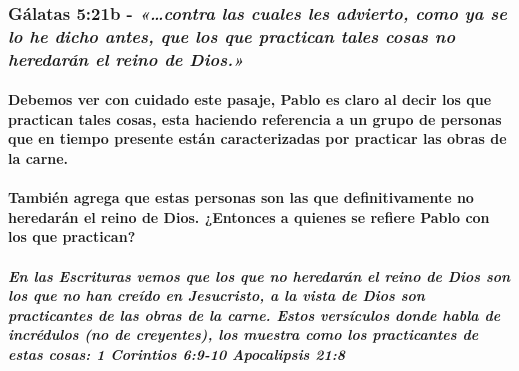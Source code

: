 \documentclass[11a pt,twoside]{article}
\newcommand{\scripture}[1]{%
  {\fontsize{12pt}{16pt}\selectfont\ScriptureFont\itshape #1}%
}
\def\textbf#1{#1}%
\let\oldsubsubsection\subsubsection
\renewcommand{\subsubsection}{\needspace{4\baselineskip}\oldsubsubsection}
\let\oldparagraph\paragraph
\renewcommand{\paragraph}{\needspace{3\baselineskip}\oldparagraph}
\let\oldsubparagraph\subparagraph
\renewcommand{\subparagraph}{\needspace{2\baselineskip}\oldsubparagraph}
\begin{document}
\subsubsection{\texorpdfstring{Gálatas 5:21b -
\scripture{«…contra las cuales les advierto, como ya se lo he dicho antes, que los que practican tales cosas no heredarán el reino de Dios.»}}{Gálatas 5:21b - }}\label{guxe1latas-521b---contra-las-cuales-les-advierto-como-ya-se-lo-he-dicho-antes-que-los-que-practican-tales-cosas-no-heredaruxe1n-el-reino-de-dios.}

\paragraph{Debemos ver con cuidado este pasaje, Pablo es claro al decir
los que practican tales cosas, esta haciendo referencia a un grupo de
personas que en tiempo presente están caracterizadas por practicar las
obras de la
carne.}\label{debemos-ver-con-cuidado-este-pasaje-pablo-es-claro-al-decir-los-que-practican-tales-cosas-esta-haciendo-referencia-a-un-grupo-de-personas-que-en-tiempo-presente-estuxe1n-caracterizadas-por-practicar-las-obras-de-la-carne.}

\paragraph{\texorpdfstring{También agrega que estas personas son las que
definitivamente \textbf{no} heredarán el reino de Dios. ¿Entonces a
quienes se refiere Pablo con los que
practican?}{También agrega que estas personas son las que definitivamente no heredarán el reino de Dios. ¿Entonces a quienes se refiere Pablo con los que practican?}}\label{tambiuxe9n-agrega-que-estas-personas-son-las-que-definitivamente-no-heredaruxe1n-el-reino-de-dios.-entonces-a-quienes-se-refiere-pablo-con-los-que-practican}

\subparagraph{En las Escrituras vemos que los que no heredarán el reino
de Dios son los que no han creído en Jesucristo, a la vista de Dios son
practicantes de las obras de la carne. Estos versículos donde habla de
incrédulos (no de creyentes), los muestra como los practicantes de estas
cosas: 1 Corintios 6:9-10 Apocalipsis
21:8}\label{en-las-escrituras-vemos-que-los-que-no-heredaruxe1n-el-reino-de-dios-son-los-que-no-han-creuxeddo-en-jesucristo-a-la-vista-de-dios-son-practicantes-de-las-obras-de-la-carne.-estos-versuxedculos-donde-habla-de-incruxe9dulos-no-de-creyentes-los-muestra-como-los-practicantes-de-estas-cosas-1-corintios-69-10-apocalipsis-218}
\end{document}
